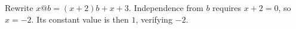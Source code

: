 Rewrite $x@b=(x+2)b+x+3$. Independence from $b$ requires $x+2=0$, so $x=-2$. Its constant value is then $1$, verifying $\boxed{-2}$.
